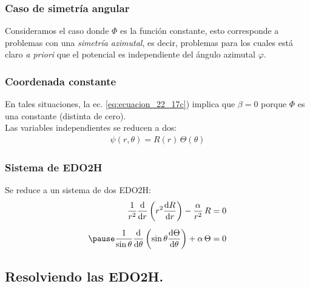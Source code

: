 \documentclass[12pt]{beamer}
\begin{document}
\begin{frame}
\frametitle{Caso de simetría angular}
Consideramos el caso donde $\Phi$ es la función constante, \pause esto corresponde a problemas con una \emph{simetría azimutal}, \pause es decir, problemas para los cuales está claro \emph{a priori} que el potencial es independiente del ángulo azimutal $\varphi$.
\end{frame}
\begin{frame}
\frametitle{Coordenada constante}
En tales situaciones, la ec. \ref{eq:ecuacion_22_17c}) implica que $\beta = 0$ porque $\Phi$ es una constante (distinta de cero).
\\
\bigskip
\pause
Las variables independientes se reducen a dos: 
\begin{align*}
\psi (r, \theta) = R (r) \, \Theta (\theta)    
\end{align*}
\end{frame}
\begin{frame}
\frametitle{Sistema de EDO2H}
Se reduce a un sistema de dos EDO2H:
\pause
\begin{eqnarray}
\begin{aligned}
\dfrac{1}{r^{2}} \dv{r} \left( r^{2} \dv{R}{r} \right) - \dfrac{\alpha}{r^{2}} \, R &= 0 \\[0.5em]  \pause
\dfrac{1}{\sin \theta} \dv{\theta} \left( \sin \theta \dv{\Theta}{\theta} \right) + \alpha \, \Theta &= 0
\end{aligned}
\label{eq:ecuacion_26_02}
\end{eqnarray}
\end{frame}

\subsection{Resolviendo las EDO2H.}
\end{document}
